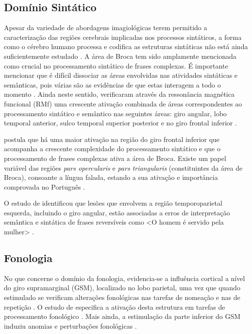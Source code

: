 \documentclass[output=paper,colorlinks,citecolor=brown,booklanguage=portuguese]{langscibook}
\begin{document}
\subsection{Domínio Sintático}

Apesar da variedade de abordagens imagiológicas terem permitido a caracterização das regiões cerebrais implicadas nos processos sintáticos, a forma como o cérebro humano processa e codifica as estruturas sintáticas não está ainda suficientemente estudado \citep{Matchin2019}. A área de Broca tem sido amplamente mencionada como crucial no processamento sintático de frases complexas. É importante mencionar que é difícil dissociar as áreas envolvidas nas atividades sintáticas e semânticas, pois várias são as evidências de que estas interagem a todo o momento \citep{Friederici2011}. Ainda neste sentido, \citet{Matchin2019} verificaram através da ressonância magnética funcional (RMf) uma crescente ativação combinada de áreas correspondentes ao processamento sintático e semântico nas seguintes áreas: giro angular, lobo temporal anterior, sulco temporal superior posterior e no giro frontal inferior \citep{Matchin2019}.

\citet{Friederici2011} postula que há uma maior ativação na região do giro frontal inferior que acompanha a crescente complexidade do processamento sintático e que o processamento de frases complexas ativa a área de Broca. Existe um papel variável das regiões \emph{pars opercularis} e \emph{pars triangularis} (constituintes da área de Broca), consoante a língua falada, estando a sua ativação e importância comprovada no Português \citep{Friederici2011, Matos2002}.

O estudo de \citet{Thothathiri2012} identificou que lesões que envolvem a região temporoparietal esquerda, incluindo o giro angular, estão associadas a erros de interpretação semântica e sintática de frases reversíveis como <O homem é servido pela mulher> \citep{Thothathiri2012}.

\subsection{Fonologia}

No que concerne o domínio da fonologia, evidencia-se a influência cortical a nível do giro supramarginal (GSM), localizado no lobo parietal, uma vez que quando estimulado se verificam alterações fonológicas nas tarefas de nomeação e nas de repetição \citep{Duffau2007, Duffau2005, Maldonado2011, MoritzGasser2013}. O estudo de \citet{Maldonado2011} especifica a ativação desta estrutura em tarefas de processamento fonológico \citet{Maldonado2011}. Mais ainda, a estimulação da parte inferior do GSM induziu anomias e perturbações fonológicas \citep{MoritzGasser2013}. 
\end{document}
